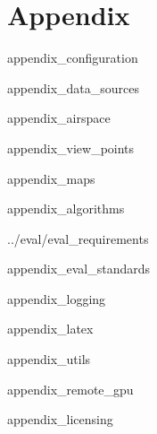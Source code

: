 \chapter{Appendix}
\label{sec:appendix}

 {appendix_configuration}

 {appendix_data_sources}

 {appendix_airspace}

 {appendix_view_points}

 {appendix_maps}

 {appendix_algorithms}

 {../eval/eval_requirements}

 {appendix_eval_standards}

 {appendix_logging}

 {appendix_latex}

 {appendix_utils}

 {appendix_remote_gpu}

 {appendix_licensing}
